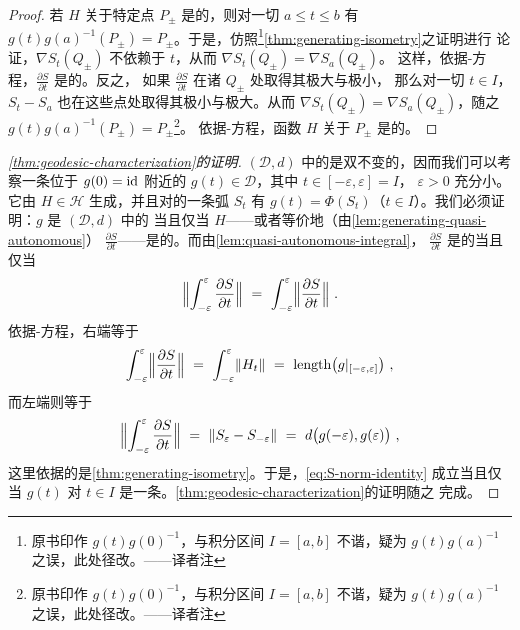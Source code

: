 \begin{proof}
若 $H$ 关于特定点 $P_{\pm}$ 是\trQuasiAutonomous{}的，则对一切 $a\leq t\leq b$ 有%
$g(t)g(a)^{-1}(P_{\pm})=P_{\pm}$。于是，仿照\footnote{原书印作 $g(t)g(0)^{-1}$，与积分区间 $I=[a,b]$ 不谐，疑为 $g(t)g(a)^{-1}$ 之误，此处径改。——译者注}\cref{thm:generating-isometry}之证明进行%
论证，$\nabla S_{t}(Q_{\pm})$ 不依赖于 $t$，从而 $\nabla S_{t}(Q_{\pm})=\nabla S_{a}(Q_{\pm})$。%
这样，依据\trHamilton-\trJacobi{}方程，$\frac{\partial S}{\partial t}$ 是\trQuasiAutonomous{}的。反之，%
如果 $\frac{\partial S}{\partial t}$ 在诸\trFixedPoint{} $Q_{\pm}$ 处取得其极大与极小，%
那么对一切 $t\in I$，$S_{t}-S_{a}$ 也在这些点处取得其极小与极大。从而%
$\nabla S_{t}(Q_{\pm})=\nabla S_{a}(Q_{\pm})$，随之 $g(t)g(a)^{-1}(P_{\pm})=P_{\pm}$\footnote{原书印作 $g(t)g(0)^{-1}$，与积分区间 $I=[a,b]$ 不谐，疑为 $g(t)g(a)^{-1}$ 之误，此处径改。——译者注}。%
依据\trHamilton-\trJacobi{}方程，函数 $H$ 关于 $P_{\pm}$ 是\trQuasiAutonomous{}的。
\end{proof}

\begin{proof}[\cref*{thm:geodesic-characterization}的证明]
$(\mathcal{D},d)$ 中的\trMetric{}是双不变的，因而我们可以考察一条位于%
\trIdentityMap{} $g(0)=\mathrm{id}$ 附近的\trPath{} $g(t)\in\mathcal{D}$，其中 $t\in[-\varepsilon,\varepsilon]=I$，%
$\varepsilon>0$ 充分小。它由 $H\in\mathcal{H}$ 生成，并且对\trGeneratingFunction{}的一条弧 $S_{t}$ 有%
$g(t)=\varPhi(S_{t})$（$t\in I$）。我们必须证明：$g$ 是 $(\mathcal{D},d)$ 中的\trMinimal%
\trGeodesic{}当且仅当 $H$——或者等价地（由\cref{lem:generating-quasi-autonomous}）%
$\frac{\partial S}{\partial t}$——是\trQuasiAutonomous{}的。而由\cref{lem:quasi-autonomous-integral}，%
$\frac{\partial S}{\partial t}$ 是\trQuasiAutonomous{}的当且仅当
\begin{equation}\label{eq:S-norm-identity}
\Bigl\lVert\int_{-\varepsilon}^{\varepsilon}\frac{\partial S}{\partial t}\Bigr\rVert\ =\ %
\int_{-\varepsilon}^{\varepsilon}\Bigl\lVert\frac{\partial S}{\partial t}\Bigr\rVert\ .
\end{equation}
依据\trHamilton-\trJacobi{}方程，右端等于
\[
\int_{-\varepsilon}^{\varepsilon}\Bigl\lVert\frac{\partial S}{\partial t}\Bigr\rVert\ =\ %
\int_{-\varepsilon}^{\varepsilon}\lVert H_{t}\rVert\ =\ %
\operatorname{length}\bigl(g|_{[-\varepsilon,\varepsilon]}\bigr)\ ,
\]
而左端则等于
\[
\Bigl\lVert\int_{-\varepsilon}^{\varepsilon}\frac{\partial S}{\partial t}\Bigr\rVert\ =\ %
\lVert S_{\varepsilon}-S_{-\varepsilon}\rVert\ =\ d\bigl(g(-\varepsilon),g(\varepsilon)\bigr)\ ,
\]
这里依据的是\cref{thm:generating-isometry}。于是，\eqref{eq:S-norm-identity} 成立当且仅当%
$g(t)$ 对 $t\in I$ 是一条\trMinimal\trGeodesic。\cref{thm:geodesic-characterization}的证明随之%
完成。
\end{proof}

